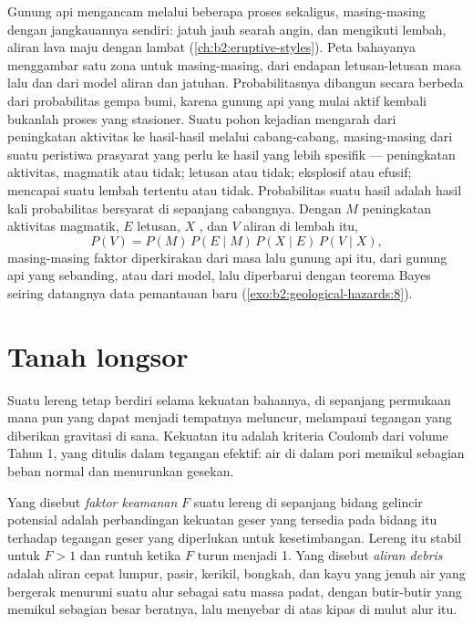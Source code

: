 Gunung api mengancam melalui beberapa proses sekaligus, masing-masing dengan jangkauannya sendiri:  jatuh jauh
searah angin,  dan  mengikuti lembah, aliran lava maju dengan lambat
(\cref{ch:b2:eruptive-styles}). Peta bahayanya menggambar satu zona untuk masing-masing, dari endapan letusan-letusan
masa lalu dan dari model aliran dan jatuhan. Probabilitasnya dibangun secara berbeda dari probabilitas
gempa bumi, karena gunung api yang mulai aktif kembali bukanlah proses yang stasioner. Suatu pohon kejadian mengarah
dari peningkatan aktivitas ke hasil-hasil melalui cabang-cabang, masing-masing dari suatu peristiwa prasyarat yang perlu ke hasil yang lebih
spesifik --- peningkatan aktivitas, magmatik atau tidak; letusan atau tidak; eksplosif atau efusif; 
mencapai suatu lembah tertentu atau tidak. Probabilitas suatu hasil adalah hasil kali probabilitas
bersyarat di sepanjang cabangnya. Dengan $M$ peningkatan aktivitas magmatik, $E$ letusan, $X$ , dan $V$ aliran di lembah itu,
\begin{equation*}
P(V) = P(M) \, P(E \mid M) \, P(X \mid E) \, P(V \mid X),
\end{equation*}
masing-masing faktor diperkirakan dari masa lalu gunung api itu, dari gunung api yang sebanding, atau dari model, lalu diperbarui dengan
teorema Bayes seiring datangnya data pemantauan baru (\cref{exo:b2:geological-hazards:8}).

\section{Tanah longsor}\label{sec:b2:geological-hazards:landslides}

Suatu lereng tetap berdiri selama kekuatan bahannya, di sepanjang permukaan mana pun yang dapat menjadi tempatnya meluncur,
melampaui tegangan yang diberikan gravitasi di sana. Kekuatan itu adalah kriteria Coulomb dari volume
Tahun 1, yang ditulis dalam tegangan efektif: air di dalam pori memikul sebagian beban normal dan
menurunkan gesekan.

\begin{definition}\label{def:b2:geological-hazards:slope}
Yang disebut \emph{faktor keamanan} $F$ suatu lereng di sepanjang bidang gelincir potensial
adalah perbandingan kekuatan geser yang tersedia pada bidang itu terhadap tegangan geser yang diperlukan untuk
kesetimbangan. Lereng itu stabil untuk $F > 1$ dan runtuh ketika $F$ turun menjadi 1. Yang disebut \emph{aliran
debris} adalah aliran cepat lumpur, pasir, kerikil, bongkah, dan kayu yang jenuh air
yang bergerak menuruni suatu alur sebagai satu massa padat, dengan butir-butir yang memikul sebagian besar beratnya, lalu menyebar
di atas kipas di mulut alur itu.
\end{definition}

